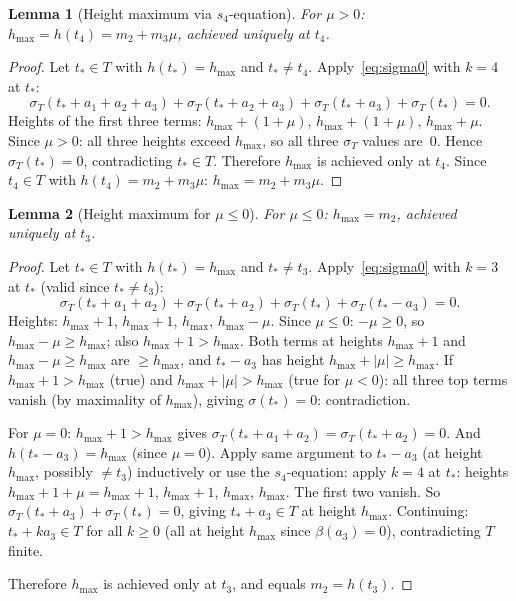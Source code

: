 \documentclass{article}
\newtheorem{lemma}{Lemma}
\begin{document}
\begin{lemma}[Height maximum via $s_4$-equation]\label{lem:betamax4mu}
For $\mu>0$: $h_{\max}=h(t_4)=m_2+m_3\mu$, achieved uniquely at $t_4$.
\end{lemma}
\begin{proof}
Let $t_*\in T$ with $h(t_*)=h_{\max}$ and $t_*\ne t_4$.
Apply~\eqref{eq:sigma0} with $k=4$ at $t_*$:
\[
  \sigma_T(t_*+a_1+a_2+a_3)+\sigma_T(t_*+a_2+a_3)+\sigma_T(t_*+a_3)+\sigma_T(t_*)=0.
\]
Heights of the first three terms: $h_{\max}+(1+\mu)$, $h_{\max}+(1+\mu)$, $h_{\max}+\mu$.
Since $\mu>0$: all three heights exceed $h_{\max}$, so all three $\sigma_T$ values are~$0$.
Hence $\sigma_T(t_*)=0$, contradicting $t_*\in T$.
Therefore $h_{\max}$ is achieved only at $t_4$.
Since $t_4\in T$ with $h(t_4)=m_2+m_3\mu$: $h_{\max}=m_2+m_3\mu$.
\end{proof}

\begin{lemma}[Height maximum for $\mu\le 0$]\label{lem:betamax4neg}
For $\mu\le 0$: $h_{\max}=m_2$, achieved uniquely at $t_3$.
\end{lemma}
\begin{proof}
Let $t_*\in T$ with $h(t_*)=h_{\max}$ and $t_*\ne t_3$.
Apply~\eqref{eq:sigma0} with $k=3$ at $t_*$ (valid since $t_*\ne t_3$):
\[
  \sigma_T(t_*+a_1+a_2)+\sigma_T(t_*+a_2)+\sigma_T(t_*)+\sigma_T(t_*-a_3)=0.
\]
Heights: $h_{\max}+1$, $h_{\max}+1$, $h_{\max}$, $h_{\max}-\mu$.
Since $\mu\le 0$: $-\mu\ge 0$, so $h_{\max}-\mu\ge h_{\max}$;
also $h_{\max}+1>h_{\max}$.
Both terms at heights $h_{\max}+1$ and $h_{\max}-\mu\ge h_{\max}$ are $\ge h_{\max}$,
and $t_*-a_3$ has height $h_{\max}+|\mu|\ge h_{\max}$.
If $h_{\max}+1>h_{\max}$ (true) and $h_{\max}+|\mu|>h_{\max}$ (true for $\mu<0$):
all three top terms vanish (by maximality of $h_{\max}$), giving $\sigma(t_*)=0$: contradiction.

For $\mu=0$: $h_{\max}+1>h_{\max}$ gives $\sigma_T(t_*+a_1+a_2)=\sigma_T(t_*+a_2)=0$.
And $h(t_*-a_3)=h_{\max}$ (since $\mu=0$).  Apply same argument to $t_*-a_3$
(at height $h_{\max}$, possibly $\ne t_3$) inductively or use the $s_4$-equation:
apply $k=4$ at $t_*$: heights $h_{\max}+1+\mu=h_{\max}+1$, $h_{\max}+1$, $h_{\max}$, $h_{\max}$.
The first two vanish.  So $\sigma_T(t_*+a_3)+\sigma_T(t_*)=0$, giving $t_*+a_3\in T$
at height $h_{\max}$.  Continuing: $t_*+ka_3\in T$ for all $k\ge 0$
(all at height $h_{\max}$ since $\beta(a_3)=0$), contradicting $T$ finite.

Therefore $h_{\max}$ is achieved only at $t_3$, and equals $m_2=h(t_3)$.
\end{proof}
\end{document}
